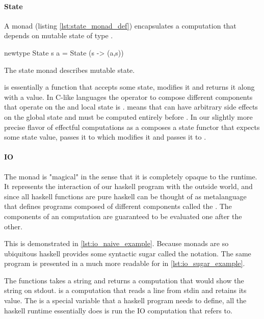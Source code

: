 \paragraph{State}

A  monad (listing \ref{lst:state_monad_def}) encapsulates
a computation that depends on mutable state of type .

\begin{code}
\begin{haskellcode}
newtype State s a = State (s -> (a,s))
\end{haskellcode}
\label{lst:state_monad_def}
\caption{The state monad describes mutable state.}
\end{code}

 is essentially a function that accepts some state, modifies it
and returns it along with a value. In C-like languages the operator to
compose different components that operate on the and local state is
\cpp{;}.  means that  can have arbitrary side effects on
the global state and must be computed entirely before . In our
slightly more precise flavor of effectful computations  as a
 composes a state functor that expects some state value, passes
it to  which modifies it and passes it to .

\paragraph{IO}

The  monad is "magical" in the sense that it is completely
opaque to the runtime. It represents the interaction of our haskell
program with the outside world, and since all haskell functions are
pure haskell can be thought of as metalanguage that defines programs
composed of different  components called the . The components of an  computation are guaranteed to
be evaluated one after the other.

This is demonstrated in \ref{lst:io_naive_example}. Because monads are so
ubiquitous haskell provides some syntactic sugar called the 
notation. The same program is presented in a much more readable for in
\ref{lst:io_sugar_example}.

The functions  takes a string and returns
a computation that would show the string on stdout.  is a computation that reads a line from stdin and retains its
value. The  is a special variable that a haskell
program needs to define, all the haskell runtime essentially does is
run the IO computation that  refers to.

